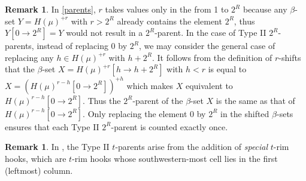 \documentclass[12pt]{amsart}
\theoremstyle{definition}
\newtheorem{remark}[theorem]{Remark}
\numberwithin{equation}{section}
\begin{document}
\begin{remark}\label{rem:typeii-quirks}
   In \cref{parents}, $r$ takes values only in the from 1 to $2^R$ because any $\beta$-set $Y = H(\mu)^{+r}$ with $r > 2^R$ already contains the element $2^R$, thus $Y[0\to 2^R] = Y$ would not result in a $2^R$-parent.  
    In the case of Type II $2^R$-parents, instead of replacing 0 by $2^R$, we may consider the general case of replacing any $h\in H(\mu)^{+r}$ with $h+2^R$. It follows from the definition of $r$-shifts that the $\beta$-set $X = H(\mu)^{+r}[h\to h+2^R]$ with $h < r$ is equal to $X = (H(\mu)^{r-h}[0\to 2^R])^{+h}$ which makes $X$ equivalent to $H(\mu)^{r-h}[0\to 2^R]$. Thus the $2^R$-parent of the $\beta$-set $X$ is the same as that of $H(\mu)^{r-h}[0\to 2^R]$. Only replacing the element 0 by $2^R$ in the shifted $\beta$-sets ensures that each Type II $2^R$-parent is counted exactly once.
\end{remark}
\begin{remark}
    In \cite{inv_kostka}, the Type II $t$-parents arise from the addition of \textit{special} $t$-rim hooks, which are $t$-rim hooks whose southwestern-most cell lies in the first (leftmost) column.
\end{remark}
\end{document}
